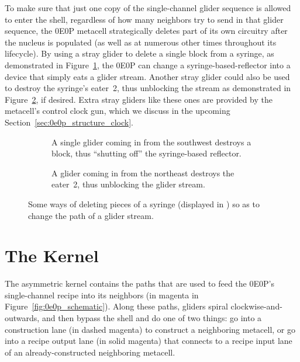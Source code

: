 To make sure that just one copy of the single-channel glider sequence is allowed to enter the shell, regardless of how many neighbors try to send in that glider sequence, the 0E0P metacell strategically deletes part of its own circuitry after the nucleus is populated (as well as at numerous other times throughout its lifecycle). By using a stray glider to delete a single block from a syringe, as demonstrated in Figure~\ref{fig:syringe_delete_block}, the 0E0P can change a syringe-based-reflector into a device that simply eats a glider stream. Another stray glider could also be used to destroy the syringe's eater~2, thus unblocking the stream as demonstrated in Figure~\ref{fig:syringe_delete_eater}, if desired. Extra stray gliders like these ones are provided by the metacell's control clock gun, which we discuss in the upcoming Section~\ref{sec:0e0p_structure_clock}.

\begin{figure}[!htb]
	\centering
	\begin{subfigure}{.535\textwidth}
		\centering
		\caption{A single glider coming in from the southwest destroys a block, thus ``shutting off'' the syringe-based reflector.}
		\label{fig:syringe_delete_block}
	\end{subfigure} \hfill \begin{subfigure}{.435\textwidth}
		\centering
		\caption{A glider coming in from the northeast destroys the eater~2, thus unblocking the glider stream.}
		\label{fig:syringe_delete_eater}
	\end{subfigure}
	\caption{Some ways of deleting pieces of a syringe (displayed in ) so as to change the path of a glider stream.}\label{fig:syringe_path_changer}
\end{figure}


\section{The Kernel}\label{sec:0e0p_structure_kernel}

The asymmetric kernel contains the paths that are used to feed the 0E0P's single-channel recipe into its neighbors (in magenta in Figure~\ref{fig:0e0p_schematic}). Along these paths, gliders spiral clockwise-and-outwards, and then bypass the shell and do one of two things: go into a construction lane (in dashed magenta) to construct a neighboring metacell, or go into a recipe output lane (in solid magenta) that connects to a recipe input lane of an already-constructed neighboring metacell.

